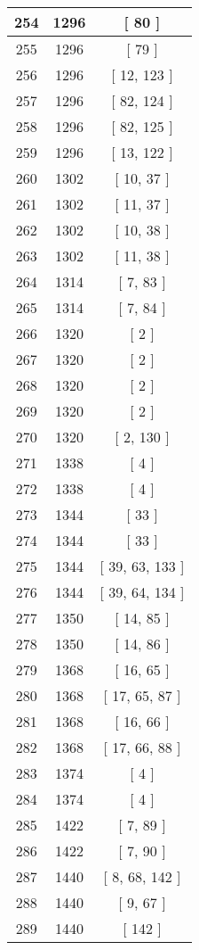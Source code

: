 \begin{center}
\begin{longtable}[H]{|| c c c ||}
254 & 1296 & [ 80 ] \\ 
\hline
255 & 1296 & [ 79 ] \\ 
\hline
256 & 1296 & [ 12, 123 ] \\ 
\hline
257 & 1296 & [ 82, 124 ] \\ 
\hline
258 & 1296 & [ 82, 125 ] \\ 
\hline
259 & 1296 & [ 13, 122 ] \\ 
\hline
260 & 1302 & [ 10, 37 ] \\ 
\hline
261 & 1302 & [ 11, 37 ] \\ 
\hline
262 & 1302 & [ 10, 38 ] \\ 
\hline
263 & 1302 & [ 11, 38 ] \\ 
\hline
264 & 1314 & [ 7, 83 ] \\ 
\hline
265 & 1314 & [ 7, 84 ] \\ 
\hline
266 & 1320 & [ 2 ] \\ 
\hline
267 & 1320 & [ 2 ] \\ 
\hline
268 & 1320 & [ 2 ] \\ 
\hline
269 & 1320 & [ 2 ] \\ 
\hline
270 & 1320 & [ 2, 130 ] \\ 
\hline
271 & 1338 & [ 4 ] \\ 
\hline
272 & 1338 & [ 4 ] \\ 
\hline
273 & 1344 & [ 33 ] \\ 
\hline
274 & 1344 & [ 33 ] \\ 
\hline
275 & 1344 & [ 39, 63, 133 ] \\ 
\hline
276 & 1344 & [ 39, 64, 134 ] \\ 
\hline
277 & 1350 & [ 14, 85 ] \\ 
\hline
278 & 1350 & [ 14, 86 ] \\ 
\hline
279 & 1368 & [ 16, 65 ] \\ 
\hline
280 & 1368 & [ 17, 65, 87 ] \\ 
\hline
281 & 1368 & [ 16, 66 ] \\ 
\hline
282 & 1368 & [ 17, 66, 88 ] \\ 
\hline
283 & 1374 & [ 4 ] \\ 
\hline
284 & 1374 & [ 4 ] \\ 
\hline
285 & 1422 & [ 7, 89 ] \\ 
\hline
286 & 1422 & [ 7, 90 ] \\ 
\hline
287 & 1440 & [ 8, 68, 142 ] \\ 
\hline
288 & 1440 & [ 9, 67 ] \\ 
\hline
289 & 1440 & [ 142 ] \\ 

\end{longtable}
\end{center}
